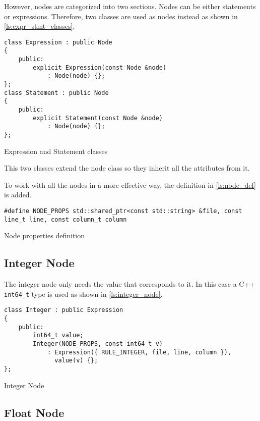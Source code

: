 However, nodes are categorized into two sections. Nodes can be either statements or expressions. Therefore, two classes
are used as nodes instead as shown in \autoref{ls:expr_stmt_classes}.

\begin{listing}[H]
\begin{verbatim}
class Expression : public Node
{
    public:
        explicit Expression(const Node &node)
            : Node(node) {};
};
class Statement : public Node
{
    public:
        explicit Statement(const Node &node)
            : Node(node) {};
};
\end{verbatim}
\caption{Expression and Statement classes}
\label{ls:expr_stmt_classes}
\end{listing}

This two classes extend the node class so they inherit all the attributes from it.

To work with all the nodes in a more effective way, the definition in \autoref{ls:node_def} is added.

\begin{listing}[H]
\begin{verbatim}
#define NODE_PROPS std::shared_ptr<const std::string> &file, const line_t line, const column_t column
\end{verbatim}
\caption{Node properties definition}
\label{ls:node_def}
\end{listing}

\subsection{Integer Node}

The integer node only needs the value that corresponds to it. In this case a C++ \texttt{int64\_t} type is used as shown in
\autoref{ls:integer_node}.

\begin{listing}[H]
\begin{verbatim}
class Integer : public Expression
{
    public:
        int64_t value;
        Integer(NODE_PROPS, const int64_t v)
            : Expression({ RULE_INTEGER, file, line, column }),
              value(v) {};
};
\end{verbatim}
\caption{Integer Node}
\label{ls:integer_node}
\end{listing}

\subsection{Float Node}

